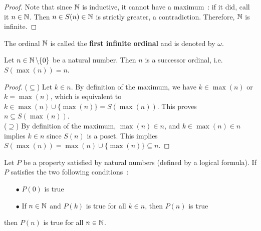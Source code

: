 \begin{proof}
    Note that since $\operatorname{\mathbb N}$ is inductive, it cannot have a maximum~: if it did, call it $n \in \operatorname{\mathbb N}$. Then $n \in S(n) \in \operatorname{\mathbb N}$ is strictly greater, a contradiction. Therefore, $\operatorname{\mathbb N}$ is infinite.
\end{proof}

\begin{definition} \label{first-infinite-ordinal}
    The ordinal $\operatorname{\mathbb N}$ is called the \textbf{first infinite ordinal} and is denoted by $\omega$. 
\end{definition}

\begin{lemma} \label{nonzero-naturals-have-predecessors}
    Let $n \in \operatorname{\mathbb N} \setminus \{0\}$ be a natural number. Then $n$ is a successor ordinal, i.e. $S(\max{(n)}) = n$.
\end{lemma}

\begin{proof}
    ($\subseteq$) Let $k \in n$. By definition of the maximum, we have $k \in \max{(n)}$ or $k = \max{(n)}$, which is equivalent to $k \in \max{(n)} \cup \{\max{(n)}\} = S(\max{(n)})$. This proves $n \subseteq S(\max{(n)})$.
    \\
    
    ($\supseteq$) By definition of the maximum, $\max{(n)} \in n$, and $k \in \max{(n)} \in n$ implies $k \in n$ since $S(n)$ is a poset. This implies $S(\max{(n)}) = \max{(n)} \cup \{\max{(n)}\} \subseteq n$.
\end{proof}

\begin{corollary} \label{strong-induction-on-natural-numbers}
    Let $P$ be a property satisfied by natural numbers (defined by a logical formula). If $P$ satisfies the two following conditions~:
    \\

    \begin{itemize}
        \item[$\bullet$] $P(0)$ is true
        \\

        \item[$\bullet$] If $n \in \operatorname{\mathbb N}$ and $P(k)$ is true for all $k \in n$, then $P(n)$ is true
        \\
        
    \end{itemize}
    then $P(n)$ is true for all $n \in \operatorname{\mathbb N}$.
\end{corollary}

